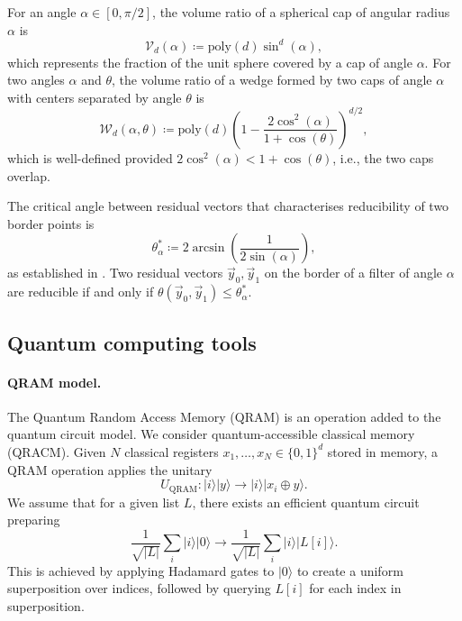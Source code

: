 \documentclass[10pt,a4paper]{article}
\begin{document}
For an angle \(\alpha\in[0,\pi/2]\), the volume ratio of a spherical cap of angular radius \(\alpha\) is
\begin{equation}
\mathcal{V}_d(\alpha) \coloneqq \mathrm{poly}(d)\sin^d(\alpha),
\end{equation}
which represents the fraction of the unit sphere covered by a cap of angle \(\alpha\). For two angles \(\alpha\) and \(\theta\), the volume ratio of a wedge formed by two caps of angle \(\alpha\) with centers separated by angle \(\theta\) is
\begin{equation}
\mathcal{W}_d(\alpha,\theta) \coloneqq \mathrm{poly}(d)\left(1-\frac{2\cos^2(\alpha)}{1+\cos(\theta)}\right)^{d/2},
\end{equation}
which is well-defined provided \(2\cos^2(\alpha) < 1+\cos(\theta)\), i.e., the two caps overlap.

The critical angle between residual vectors that characterises reducibility of two border points is
\begin{equation}
\theta_\alpha^* \coloneqq 2\arcsin\!\left(\frac{1}{2\sin(\alpha)}\right),
\end{equation}
as established in \cite[Proposition~4]{CL21}. Two residual vectors \(\vec{y}_0,\vec{y}_1\) on the border of a filter of angle \(\alpha\) are reducible if and only if \(\theta(\vec{y}_0,\vec{y}_1) \le \theta_\alpha^*\).

\subsection{Quantum computing tools}
\label{sec:quantum-tools}

\paragraph{QRAM model.}
The Quantum Random Access Memory (QRAM) is an operation added to the quantum circuit model. We consider quantum-accessible classical memory (QRACM). Given \(N\) classical registers \(x_1,\ldots,x_N\in\{0,1\}^d\) stored in memory, a QRAM operation applies the unitary
\begin{equation}
U_{\mathrm{QRAM}}: |i\rangle|y\rangle \to |i\rangle|x_i\oplus y\rangle.
\end{equation}
We assume that for a given list \(L\), there exists an efficient quantum circuit preparing
\begin{equation}
\frac{1}{\sqrt{|L|}}\sum_{i}|i\rangle|0\rangle \to \frac{1}{\sqrt{|L|}}\sum_{i}|i\rangle|L[i]\rangle.
\end{equation}
This is achieved by applying Hadamard gates to \(|0\rangle\) to create a uniform superposition over indices, followed by querying \(L[i]\) for each index in superposition.
\end{document}
